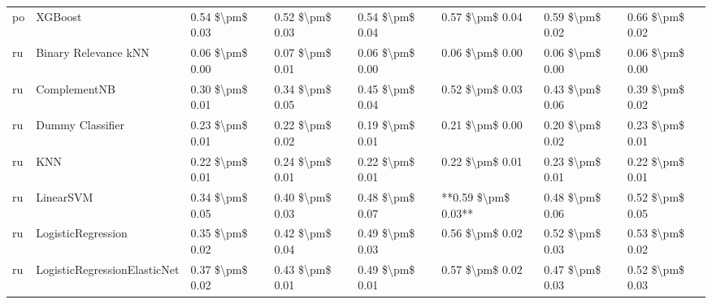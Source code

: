 \begin{tabular}{llllllll}
      po &                         XGBoost & 0.54 \$\textbackslash pm\$ 0.03 &           0.52 \$\textbackslash pm\$ 0.03 &       0.54 \$\textbackslash pm\$ 0.04 &        0.57 \$\textbackslash pm\$ 0.04 &                         0.59 \$\textbackslash pm\$ 0.02 &     0.66 \$\textbackslash pm\$ 0.02 \\
      ru &            Binary Relevance kNN & 0.06 \$\textbackslash pm\$ 0.00 &           0.07 \$\textbackslash pm\$ 0.01 &       0.06 \$\textbackslash pm\$ 0.00 &        0.06 \$\textbackslash pm\$ 0.00 &                         0.06 \$\textbackslash pm\$ 0.00 &     0.06 \$\textbackslash pm\$ 0.00 \\
      ru &                    ComplementNB & 0.30 \$\textbackslash pm\$ 0.01 &           0.34 \$\textbackslash pm\$ 0.05 &       0.45 \$\textbackslash pm\$ 0.04 &        0.52 \$\textbackslash pm\$ 0.03 &                         0.43 \$\textbackslash pm\$ 0.06 &     0.39 \$\textbackslash pm\$ 0.02 \\
      ru &                Dummy Classifier & 0.23 \$\textbackslash pm\$ 0.01 &           0.22 \$\textbackslash pm\$ 0.02 &       0.19 \$\textbackslash pm\$ 0.01 &        0.21 \$\textbackslash pm\$ 0.00 &                         0.20 \$\textbackslash pm\$ 0.02 &     0.23 \$\textbackslash pm\$ 0.01 \\
      ru &                             KNN & 0.22 \$\textbackslash pm\$ 0.01 &           0.24 \$\textbackslash pm\$ 0.01 &       0.22 \$\textbackslash pm\$ 0.01 &        0.22 \$\textbackslash pm\$ 0.01 &                         0.23 \$\textbackslash pm\$ 0.01 &     0.22 \$\textbackslash pm\$ 0.01 \\
      ru &                       LinearSVM & 0.34 \$\textbackslash pm\$ 0.05 &           0.40 \$\textbackslash pm\$ 0.03 &       0.48 \$\textbackslash pm\$ 0.07 &    **0.59 \$\textbackslash pm\$ 0.03** &                         0.48 \$\textbackslash pm\$ 0.06 &     0.52 \$\textbackslash pm\$ 0.05 \\
      ru &              LogisticRegression & 0.35 \$\textbackslash pm\$ 0.02 &           0.42 \$\textbackslash pm\$ 0.04 &       0.49 \$\textbackslash pm\$ 0.03 &        0.56 \$\textbackslash pm\$ 0.02 &                         0.52 \$\textbackslash pm\$ 0.03 &     0.53 \$\textbackslash pm\$ 0.02 \\
      ru &    LogisticRegressionElasticNet & 0.37 \$\textbackslash pm\$ 0.02 &           0.43 \$\textbackslash pm\$ 0.01 &       0.49 \$\textbackslash pm\$ 0.01 &        0.57 \$\textbackslash pm\$ 0.02 &                         0.47 \$\textbackslash pm\$ 0.03 &     0.52 \$\textbackslash pm\$ 0.03 \\

\end{tabular}

